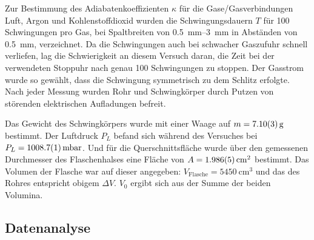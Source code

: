 		Zur Bestimmung des Adiabatenkoeffizienten $\kappa$ für die Gase/Gasverbindungen Luft, Argon und Kohlenstoffdioxid wurden die Schwingungsdauern $T$ für 100 Schwingungen pro Gas, bei Spaltbreiten von \SIrange{0,5}{3}{\milli\meter} in Abständen von \SI{0,5}{\milli\meter}, verzeichnet. 
		Da die Schwingungen auch bei schwacher Gaszufuhr schnell verliefen, lag die Schwierigkeit an diesem Versuch daran, die Zeit bei der verwendeten Stoppuhr nach genau 100 Schwingungen zu stoppen.
		Der Gasstrom wurde so gewählt, dass die Schwingung symmetrisch zu dem Schlitz erfolgte.
		Nach jeder Messung wurden Rohr und Schwingkörper durch Putzen von störenden elektrischen Aufladungen befreit.
		
		Das Gewicht des Schwingkörpers wurde mit einer Waage auf $m = \SI{7,1+-0,03}{\gram}$ bestimmt. 
		Der Luftdruck $P_L$ befand sich während des Versuches bei $P_L = \SI{1008,7+-0,1}{\milli\bar}$.
		Und für die Querschnittsfläche wurde über den gemessenen Durchmesser des Flaschenhalses eine Fläche von $A = \SI{1,986+-0,005}{\centi\meter^2}$ bestimmt.
		Das Volumen der Flasche war auf dieser angegeben: $V_\text{Flasche} = \SI{5450}{\centi\meter^3}$ und das des Rohres entspricht obigem $\Delta V$.
		$V_0$ ergibt sich aus der Summe der beiden Volumina.
		
	\subsection{Datenanalyse}
	
